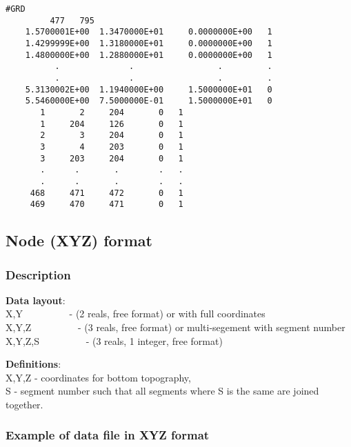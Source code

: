 \documentclass{article}
\begin{document}
\begin{small}
\begin{lstlisting}
#GRD
         477   795
    1.5700001E+00  1.3470000E+01     0.0000000E+00   1  
    1.4299999E+00  1.3180000E+01     0.0000000E+00   1  
    1.4800000E+00  1.2880000E+01     0.0000000E+00   1  
          .              .                 .         .
          .              .                 .         .
    5.3130002E+00  1.1940000E+00     1.5000000E+01   0  
    5.5460000E+00  7.5000000E-01     1.5000000E+01   0  
       1       2     204       0   1
       1     204     126       0   1
       2       3     204       0   1
       3       4     203       0   1
       3     203     204       0   1
       .      .       .        .   .
       .      .       .        .   .
     468     471     472       0   1
     469     470     471       0   1
\end{lstlisting}
\end{small}

\newpage
\subsection[Node (XYZ) format]{Node (XYZ) format}
\subsubsection[Description]{Description}

\textbf{Data layout}: \\ 

\noindent
X,Y \ \ \ \ \ \ \ \ \ {}- (2 reals, free format)\newline
or with full coordinates \\
X,Y,Z \ \ \ \ \ \ \ \ \ {}- (3 reals, free format)\newline
or multi-segement with segment number \\
X,Y,Z,S \ \ \ \ \ \ \ \ \ {}- (3 reals, 1 integer, free format)\newline

\noindent\textbf{Definitions}:\\ 

\noindent
X,Y,Z - coordinates for bottom topography, \\
S - segment number such that all segments where S is the same are joined together. \\


\subsubsection{Example of data file in XYZ format}
\end{document}
